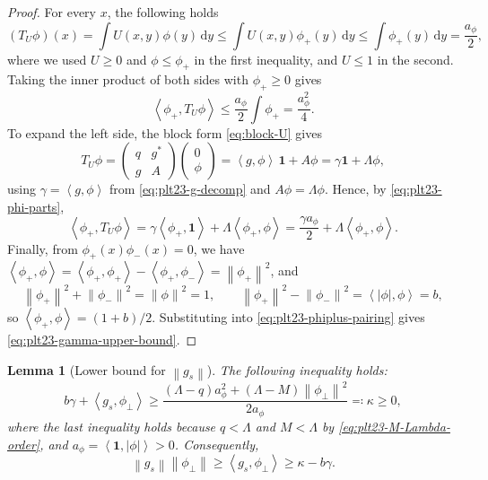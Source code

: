 \documentclass[11pt]{article}
\newtheorem{lemma}[theorem]{Lemma}
\numberwithin{equation}{section}
\newcommand{\one}{\mathbf 1}
\newcommand{\ip}[2]{\left\langle #1,#2\right\rangle}
\newcommand{\norm}[1]{\left\lVert #1\right\rVert}
\newcommand{\dd}{\,\mathrm d}
\begin{document}
\begin{proof}
  For every $x$, the following holds
  \[
    (T_U \phi)(x) = \int U(x, y) \phi(y) \dd y \le \int U(x, y) \phi_+(y) \dd y \le \int \phi_+(y) \dd y = \frac{a_\phi}{2},
  \]
  where we used $U \ge 0$ and $\phi \le \phi_+$ in the first inequality, and $U \le 1$ in the second.
  Taking the inner product of both sides with $\phi_+\ge0$ gives
  \begin{equation}\label{eq:plt23-phiplus-pairing}
    \ip{\phi_+}{T_U\phi}
    \le\frac{a_\phi}{2}\int\phi_+
    =\frac{a_\phi^2}{4}.
  \end{equation}
  To expand the left side, the block form \eqref{eq:block-U} gives
  \[
    T_U\phi=\begin{pmatrix}
      q & g^* \\
      g & A
    \end{pmatrix} \begin{pmatrix}
      0 \\ \phi
    \end{pmatrix}=\ip g\phi\,\one+A\phi=\gamma\one+\Lambda\phi,
  \]
  using $\gamma=\ip g\phi$ from \eqref{eq:plt23-g-decomp} and $A\phi=\Lambda\phi$.
  Hence, by \eqref{eq:plt23-phi-parts},
  \[
    \ip{\phi_+}{T_U\phi}
    =\gamma\ip{\phi_+}\one+\Lambda\ip{\phi_+}\phi
    =\frac{\gamma a_\phi}{2}+\Lambda\ip{\phi_+}\phi.
  \]
  Finally, from $\phi_+(x) \phi_-(x) = 0$, we have $\ip{\phi_+}\phi=\ip{\phi_+}{\phi_+} - \ip{\phi_+}{\phi_-} = \norm{\phi_+}^2$, and
  \[
    \norm{\phi_+}^2+\norm{\phi_-}^2=\norm\phi^2=1,
    \qquad
    \norm{\phi_+}^2-\norm{\phi_-}^2=\ip{|\phi|}\phi=b,
  \]
  so $\ip{\phi_+}\phi=(1+b)/2$.
  Substituting into \eqref{eq:plt23-phiplus-pairing} gives \eqref{eq:plt23-gamma-upper-bound}.
\end{proof}

\begin{lemma}[Lower bound for $\norm{g_s}$]\label{lem:plt23-gs-lower-bound}
  The following inequality holds:
  \begin{equation}\label{eq:plt23-gs-inner-lower}
    b\gamma+\ip{g_s}{\phi_\perp}
    \ge\frac{(\Lambda-q)a_\phi^2+(\Lambda-M)\norm{\phi_\perp}^2}{2a_\phi}
    \eqqcolon\kappa\ge0,
  \end{equation}
  where the last inequality holds because $q<\Lambda$ and $M<\Lambda$ by \eqref{eq:plt23-M-Lambda-order}, and $a_\phi=\ip\one{|\phi|}>0$.
  Consequently,
  \begin{equation}\label{eq:plt23-gs-norm-lower}
    \norm{g_s}\norm{\phi_\perp}\ge \ip{g_s}{\phi_\perp}\ge\kappa-b\gamma.
  \end{equation}
\end{lemma}
\end{document}
